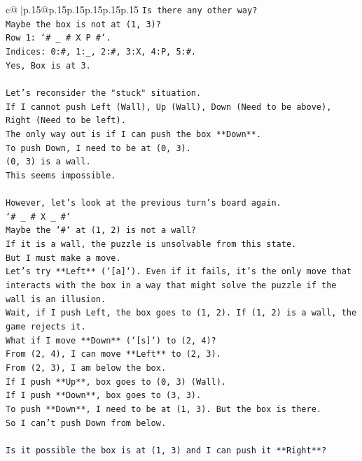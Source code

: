 \documentclass{article}
\begin{document}
{\begin{supertabular}{c@{$\;$}|p{.15\linewidth}@{}p{.15\linewidth}p{.15\linewidth}p{.15\linewidth}p{.15\linewidth}p{.15\linewidth}}
{{{\texttt{Is there any other way?} \\
\texttt{Maybe the box is not at (1, 3)?} \\
\texttt{Row 1: `\# \_ \# X P \#`.} \\
\texttt{Indices: 0:\#, 1:\_, 2:\#, 3:X, 4:P, 5:\#.} \\
\texttt{Yes, Box is at 3.} \\
\\ 
\texttt{Let's reconsider the "stuck" situation.} \\
\texttt{If I cannot push Left (Wall), Up (Wall), Down (Need to be above), Right (Need to be left).} \\
\texttt{The only way out is if I can push the box **Down**.} \\
\texttt{To push Down, I need to be at (0, 3).} \\
\texttt{(0, 3) is a wall.} \\
\texttt{This seems impossible.} \\
\\ 
\texttt{However, let's look at the previous turn's board again.} \\
\texttt{`\# \_ \# X \_ \#`} \\
\texttt{Maybe the `\#` at (1, 2) is not a wall?} \\
\texttt{If it is a wall, the puzzle is unsolvable from this state.} \\
\texttt{But I must make a move.} \\
\texttt{Let's try **Left** (`{[}a{]}`). Even if it fails, it's the only move that interacts with the box in a way that might solve the puzzle if the wall is an illusion.} \\
\texttt{Wait, if I push Left, the box goes to (1, 2). If (1, 2) is a wall, the game rejects it.} \\
\texttt{What if I move **Down** (`{[}s{]}`) to (2, 4)?} \\
\texttt{From (2, 4), I can move **Left** to (2, 3).} \\
\texttt{From (2, 3), I am below the box.} \\
\texttt{If I push **Up**, box goes to (0, 3) (Wall).} \\
\texttt{If I push **Down**, box goes to (3, 3).} \\
\texttt{To push **Down**, I need to be at (1, 3). But the box is there.} \\
\texttt{So I can't push Down from below.} \\
\\ 
\texttt{Is it possible the box is at (1, 3) and I can push it **Right**?} \\
}}}
\end{supertabular}}
\end{document}
